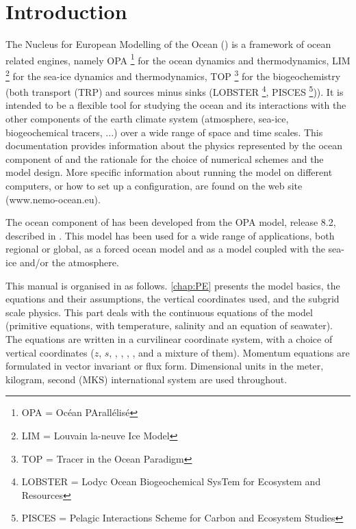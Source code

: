 \documentclass[../main/NEMO_manual]{subfiles}
\begin{document}

\chapter{Introduction}

The Nucleus for European Modelling of the Ocean (\NEMO) is a framework of ocean related engines,
namely OPA \footnote{OPA = Oc\'{e}an PArall\'{e}lis\'{e}} for the ocean dynamics and thermodynamics,
LIM \footnote{LIM = Louvain la-neuve Ice Model} for the sea-ice dynamics and thermodynamics,
TOP \footnote{TOP = Tracer in the Ocean Paradigm} for the biogeochemistry (both transport (TRP) and sources 
minus sinks (LOBSTER \footnote{LOBSTER = Lodyc Ocean Biogeochemical SysTem for Ecosystem and Resources},
PISCES \footnote{PISCES = Pelagic Interactions Scheme for Carbon and Ecosystem Studies})).
It is intended to be a flexible tool for studying the ocean and its interactions with the other components of
the earth climate system (atmosphere, sea-ice, biogeochemical tracers, ...) over
a wide range of space and time scales. 
This documentation provides information about the physics represented by the ocean component of \NEMO and
the rationale for the choice of numerical schemes and the model design.
More specific information about running the model on different computers, or how to set up a configuration,
are found on the \NEMO web site (www.nemo-ocean.eu). 

The ocean component of \NEMO has been developed from the OPA model, release 8.2, described in \citet{Madec1998}.
This model has been used for a wide range of applications, both regional or global,
as a forced ocean model and as a model coupled with the sea-ice and/or the atmosphere.  

This manual is organised in as follows.
\autoref{chap:PE} presents the model basics, \ie the equations and their assumptions,
the vertical coordinates used, and the subgrid scale physics.
This part deals with the continuous equations of the model
(primitive equations, with temperature, salinity and an equation of seawater).
The equations are written in a curvilinear coordinate system, with a choice of vertical coordinates
($z$, $s$, \zstar, \sstar, \ztilde, \stilde, and a mixture of them).
Momentum equations are formulated in vector invariant or flux form.
Dimensional units in the meter, kilogram, second (MKS) international system are used throughout.
\end{document}
